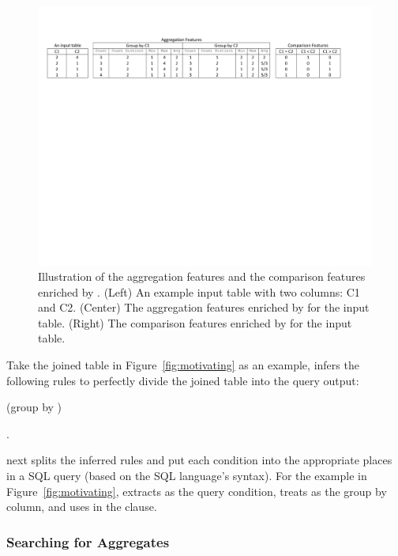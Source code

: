 \begin{figure}[t]
    \centering
    \includegraphics[scale=0.75]{featurex}
	\caption{Illustration of the aggregation features and the comparison
    features enriched by \ourtool. (Left) An example input table with
    two columns: C1 and C2. (Center) The aggregation features enriched by
    \ourtool for the input table. (Right) The comparison features
    enriched by \ourtool for the input table.
}
	\label{tbl:com}
\end{figure}


Take the joined table in Figure~\ref{fig:motivating} as an example, \ourtool
infers the following rules to perfectly divide the joined table into
the query output:

\smallskip
{
 (group by  )
}

.

\ourtool next splits the inferred rules and put each condition
into the appropriate places in a SQL query (based on the SQL language's
syntax). For the example in Figure~\ref{fig:motivating}, \ourtool
extracts  as the query
condition, treats  as the group by column,
and uses 
in the  clause.





\subsubsection{Searching for Aggregates}
\label{sec:agg_search}

